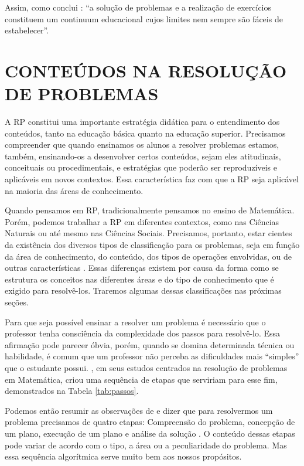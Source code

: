 Assim, como conclui : “a solução de problemas e a realização de exercícios constituem um continuum educacional cujos limites nem sempre são fáceis de estabelecer”. 

\section{CONTEÚDOS NA RESOLUÇÃO DE PROBLEMAS}

A RP constitui uma importante estratégia didática para o entendimento dos conteúdos, tanto na educação básica quanto na educação superior. Precisamos compreender que quando ensinamos os alunos a resolver problemas estamos, também, ensinando-os a desenvolver certos conteúdos, sejam eles atitudinais, conceituais ou procedimentais, e estratégias que poderão ser reproduzíveis e aplicáveis em novos contextos. Essa característica faz com que a RP seja aplicável na maioria das áreas de conhecimento. 

Quando pensamos em RP, tradicionalmente pensamos no ensino de Matemática. Porém, podemos trabalhar a RP em diferentes contextos, como nas Ciências Naturais ou até mesmo nas Ciências Sociais. Precisamos, portanto, estar cientes da existência dos diversos tipos de classificação para os problemas, seja em função da área de conhecimento, do conteúdo, dos tipos de operações envolvidas, ou de outras características \cite{Echeverria1998}. Essas diferenças existem por causa da forma como se estrutura os conceitos nas diferentes áreas e do tipo de conhecimento que é exigido para resolvê-los. Traremos algumas dessas classificações nas próximas seções. 

Para que seja possível ensinar a resolver um problema é necessário que o professor tenha consciência da complexidade dos passos para resolvê-lo. Essa afirmação pode parecer óbvia, porém, quando se domina determinada técnica ou habilidade, é comum que um professor não perceba as dificuldades mais “simples” que o estudante possui. , em seus estudos centrados na resolução de problemas em Matemática, criou uma sequência de etapas que serviriam para esse fim, demonstrados na Tabela \ref{tab:passos}. 

Podemos então resumir as observações de \cite{Polya2006} e dizer que para resolvermos um problema precisamos de quatro etapas: Compreensão do problema, concepção de um plano, execução de um plano e análise da solução \cite{Echeverria1998}. O conteúdo dessas etapas pode variar de acordo com o tipo, a área ou a peculiaridade do problema. Mas essa sequência algorítmica serve muito bem aos nossos propósitos. 

